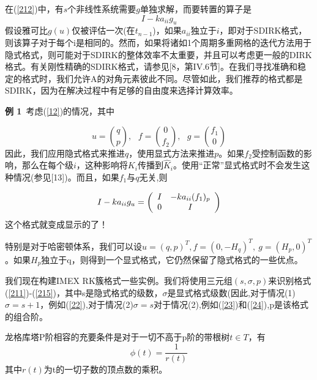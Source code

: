 \documentclass[12pt,a4paper]{article}
\begin{document}
在(\ref{212})中，有$s$个非线性系统需要$g$单独求解，而要转置的算子是
\begin{equation}
I-ka_{ii}g_{u}
\end{equation}
假设雅可比$g(u)$仅被评估一次(在$t_{n-1}$)，如果$a_{ii}$独立于$i$，即对于SDIRK格式，则该算子对于每个i是相同的。然而，如果将诸如1个周期多重网格的迭代方法用于隐式格式，则可能对于SDIRK的整体效率不太重要，并且可以考虑更一般的DIRK格式。有关刚性精确的SDIRK格式，请参见[8，第IV.6节]。在我们寻找准确和稳定的格式时，我们允许A的对角元素彼此不同。尽管如此，我们推荐的格式都是SDIRK，因为在解决过程中有足够的自由度来选择计算效率。

\textbf{例 1}~考虑(\ref{12})的情况，其中

\begin{equation}
u=\binom{q}{p},~~~f=\binom{0}{f_{2}},~~~g=\binom{f_{1}}{0}
\end{equation}
因此，我们应用隐式格式来推进$q$，使用显式方法来推进$p$。如果$f_{2}$受控制函数的影响，那么在每个级$i$，这种影响将$K_{i}$传播到$\widehat{K}_{i}$。使用“正常”显式格式时不会发生这种情况(参见[13])。而且，如果$f_{1}$与$q$无关,则

\begin{equation}
I-ka_{ii}g_{u}=\left(
\begin{array}{c c}
I & -ka_{ii}(f_{1})_{p}\\
0 & I\\
\end{array}
\right)
\end{equation}
这个格式就变成显示的了！

特别是对于哈密顿体系，我们可以设$u=(q,p)^T,f=(0,-H_{q})^T,~g=(H_{p},0)^T$。如果$H_{p}$独立于q，则得到一个显式格式，它仍然保留了隐式格式的一些优点。


我们现在构建IMEX RK簇格式一些实例。我们将使用三元组$(s,\sigma,p)$来识别格式(\ref{211})-(\ref{215})，其中s是隐式格式的级数，$\sigma$是显式格式级数(因此,对于情况(1)$\sigma=s+1$，例如(\ref{22}),对于情况(2)$\sigma=s$对于情况(2),例如(\ref{23})和(\ref{24}),p是该格式的组合阶。


龙格库塔P阶相容的充要条件是对于一切不高于p阶的带根树$t\in T$，有
\begin{equation*}
\phi(t)=\frac{1}{r(t)}
\end{equation*}
其中$r(t)$为t的一切子数的顶点数的乘积。
\end{document}
